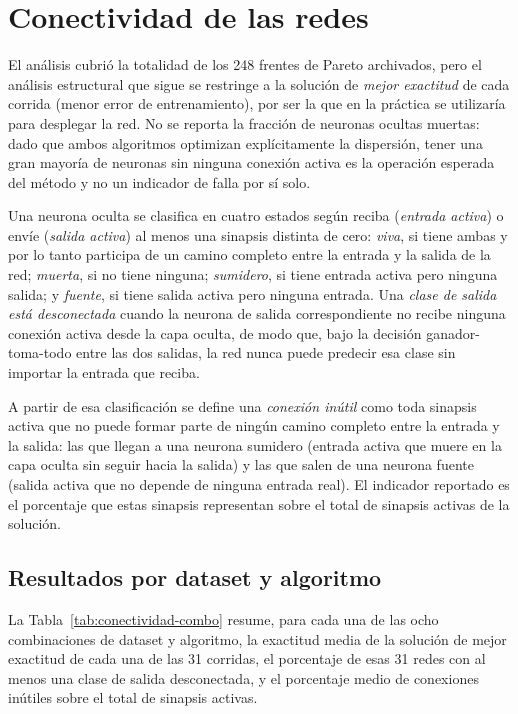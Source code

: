 \section{Conectividad de las redes}
\label{sec:conectividad}

El análisis cubrió la totalidad de los 248 frentes de Pareto archivados, pero el análisis estructural que sigue se restringe a la solución de \emph{mejor exactitud} de cada corrida (menor error de entrenamiento), por ser la que en la práctica se utilizaría para desplegar la red. No se reporta la fracción de neuronas ocultas muertas: dado que ambos algoritmos optimizan explícitamente la dispersión, tener una gran mayoría de neuronas sin ninguna conexión activa es la operación esperada del método y no un indicador de falla por sí solo.

Una neurona oculta se clasifica en cuatro estados según reciba (\emph{entrada activa}) o envíe (\emph{salida activa}) al menos una sinapsis distinta de cero: \emph{viva}, si tiene ambas y por lo tanto participa de un camino completo entre la entrada y la salida de la red; \emph{muerta}, si no tiene ninguna; \emph{sumidero}, si tiene entrada activa pero ninguna salida; y \emph{fuente}, si tiene salida activa pero ninguna entrada. Una \emph{clase de salida está desconectada} cuando la neurona de salida correspondiente no recibe ninguna conexión activa desde la capa oculta, de modo que, bajo la decisión ganador-toma-todo entre las dos salidas, la red nunca puede predecir esa clase sin importar la entrada que reciba.

A partir de esa clasificación se define una \emph{conexión inútil} como toda sinapsis activa que no puede formar parte de ningún camino completo entre la entrada y la salida: las que llegan a una neurona sumidero (entrada activa que muere en la capa oculta sin seguir hacia la salida) y las que salen de una neurona fuente (salida activa que no depende de ninguna entrada real). El indicador reportado es el porcentaje que estas sinapsis representan sobre el total de sinapsis activas de la solución.

\subsection{Resultados por dataset y algoritmo}
\label{sec:conectividad-resultados-combo}

La Tabla~\ref{tab:conectividad-combo} resume, para cada una de las ocho combinaciones de dataset y algoritmo, la exactitud media de la solución de mejor exactitud de cada una de las 31 corridas, el porcentaje de esas 31 redes con al menos una clase de salida desconectada, y el porcentaje medio de conexiones inútiles sobre el total de sinapsis activas.

